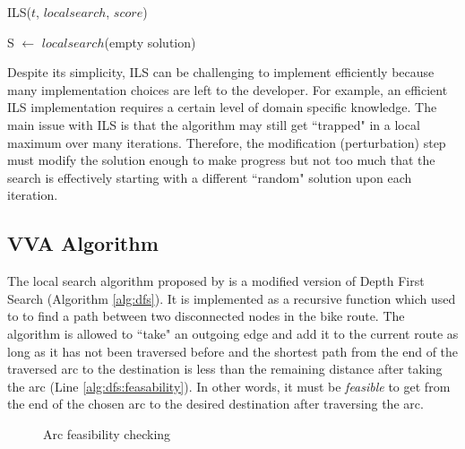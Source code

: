\documentclass[honors]{union-cs-thesis}
\newcommand{\td}{\todo[inline]}
\begin{document}
%
%
\begin{algorithm}[!h]
\caption{ILS($t$, $localsearch$, $score$)}
S $\gets$ $localsearch$(empty solution)\;
\end{algorithm}

Despite its simplicity, ILS can be challenging to implement efficiently because many implementation choices are left to the developer. For example, an efficient ILS implementation requires a certain level of domain specific knowledge. The main issue with ILS is that the algorithm may still get ``trapped" in a local maximum over many iterations. Therefore, the modification (perturbation) step must modify the solution enough to make progress but not too much that the search is effectively starting with a different ``random" solution upon each iteration. 



\subsection{VVA Algorithm}
The local search algorithm proposed by \citeauthor{verbeeck2014extension} is a modified version of Depth First Search (Algorithm \ref{alg:dfs}). It is implemented as a recursive function which used to to find a path between two disconnected nodes in the bike route. The algorithm is allowed to ``take" an outgoing edge and add it to the current route as long as it has not been traversed before and the shortest path from the end of the traversed arc to the destination is less than the remaining distance after taking the arc (Line \ref{alg:dfs:feasability}). In other words, it must be \emph{feasible} to get from the end of the chosen arc to the desired destination after traversing the arc. 

\begin{figure}
\begin{center}
\end{center}
\caption{Arc feasibility checking}
\end{figure}
\end{document}
